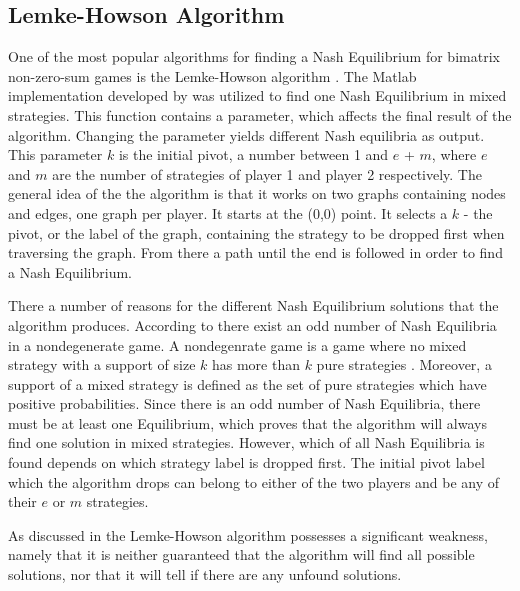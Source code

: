 \subsection{Lemke-Howson Algorithm}
One of the most popular algorithms for finding a Nash Equilibrium for bimatrix non-zero-sum games is the Lemke-Howson algorithm \citep{lemke1964equilibrium}. The Matlab implementation developed by \citep{lemkeHowson2014Matlab} was utilized to find one Nash Equilibrium in mixed strategies. This function contains a parameter, which affects the final result of the algorithm. Changing the parameter yields different Nash equilibria as output. This parameter $k$ is the initial pivot, a number between 1 and $e$ + $m$, where $e$ and $m$ are the number of strategies of player 1 and player 2 respectively. The general idea of the the algorithm is that it works on two graphs containing nodes and edges, one graph per player. It starts at the (0,0) point. It selects a $k$ - the pivot, or the label of the graph, containing the strategy to be dropped first when traversing the graph. From there a path until the end is followed in order to find a Nash Equilibrium. 

There a number of reasons for the different Nash Equilibrium solutions that the algorithm produces. According to \cite{lemke1964equilibrium} there exist an odd number of Nash Equilibria in a nondegenerate game. A nondegenrate game is a game where no mixed strategy with a support of size $k$ has more than $k$ pure strategies \citet{nisan2007algorithmic}. Moreover, a support of a mixed strategy is defined as the set of pure strategies which have positive probabilities. Since there is an odd number of Nash Equilibria, there must be at least one Equilibrium, which proves that the algorithm will always find one solution in mixed strategies. However, which of all Nash Equilibria is found depends on which strategy label is dropped first. The initial pivot label which the algorithm drops can belong to either of the two players and be any of their $e$ or $m$ strategies.

As discussed in \citep{shapley1974note} the Lemke-Howson algorithm possesses a significant weakness, namely that it is neither guaranteed that the algorithm will find all possible solutions, nor that it will tell if there are any unfound solutions.

